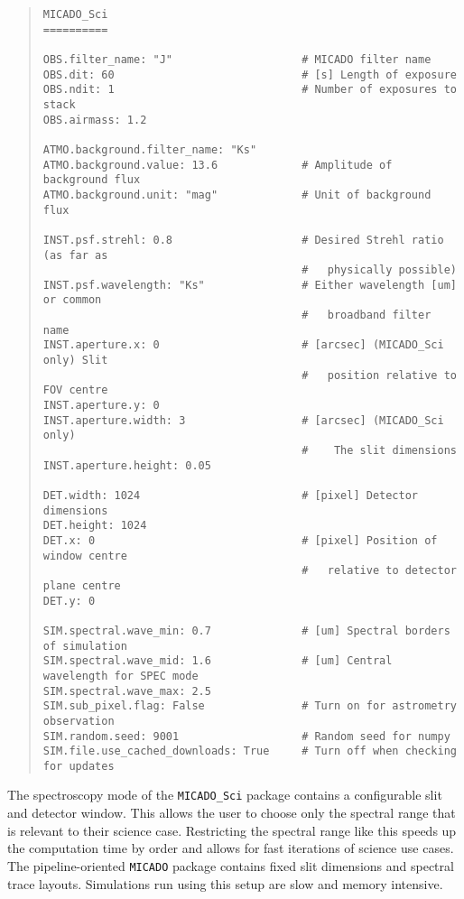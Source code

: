 \begin{quote}
\begin{alltt}
\begin{lstlisting}[frame=single]
MICADO_Sci
==========

OBS.filter_name: "J"                    # MICADO filter name
OBS.dit: 60                             # [s] Length of exposure
OBS.ndit: 1                             # Number of exposures to stack
OBS.airmass: 1.2

ATMO.background.filter_name: "Ks"
ATMO.background.value: 13.6             # Amplitude of background flux
ATMO.background.unit: "mag"             # Unit of background flux

INST.psf.strehl: 0.8                    # Desired Strehl ratio (as far as
                                        #   physically possible)
INST.psf.wavelength: "Ks"               # Either wavelength [um] or common
                                        #   broadband filter name
INST.aperture.x: 0                      # [arcsec] (MICADO_Sci only) Slit
                                        #   position relative to FOV centre
INST.aperture.y: 0
INST.aperture.width: 3                  # [arcsec] (MICADO_Sci only)
                                        #    The slit dimensions
INST.aperture.height: 0.05

DET.width: 1024                         # [pixel] Detector dimensions
DET.height: 1024
DET.x: 0                                # [pixel] Position of window centre
                                        #   relative to detector plane centre
DET.y: 0

SIM.spectral.wave_min: 0.7              # [um] Spectral borders of simulation
SIM.spectral.wave_mid: 1.6              # [um] Central wavelength for SPEC mode
SIM.spectral.wave_max: 2.5
SIM.sub_pixel.flag: False               # Turn on for astrometry observation
SIM.random.seed: 9001                   # Random seed for numpy
SIM.file.use_cached_downloads: True     # Turn off when checking for updates
\end{lstlisting}
\end{alltt}
\end{quote}

The spectroscopy mode of the \texttt{MICADO\_Sci} package contains a configurable slit and detector window.
This allows the user to choose only the spectral range that is relevant to their science case.
Restricting the spectral range like this speeds up the computation time by order and allows for fast iterations of science use cases.
The pipeline-oriented \texttt{MICADO} package contains fixed slit dimensions and spectral trace layouts.
Simulations run using this setup are slow and memory intensive.


